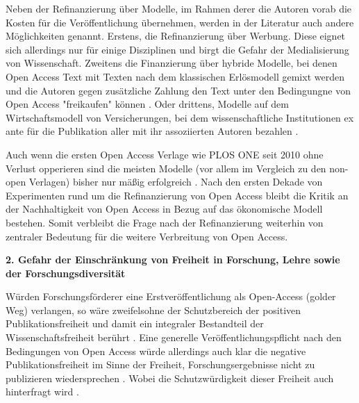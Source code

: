 Neben der Refinanzierung über Modelle, im Rahmen derer die Autoren vorab die Kosten für die Veröffentlichung übernehmen, werden in der Literatur auch andere Möglichkeiten genannt. Erstens, die Refinanzierung über Werbung. Diese eignet sich allerdings nur für einige Disziplinen \cite{bjork_2004_open} und birgt die Gefahr der Medialisierung von Wissenschaft. Zweitens die Finanzierung über hybride Modelle, bei denen Open Access Text mit Texten nach dem klassischen Erlösmodell gemixt werden und die Autoren gegen zusätzliche Zahlung den Text unter den Bedingungne von Open Access "freikaufen" können \cite{bjork_2012_hybrid}. Oder drittens, Modelle auf dem Wirtschaftsmodell von Versicherungen, bei dem wissenschaftliche Institutionen ex ante für die Publikation aller mit ihr assoziierten Autoren bezahlen \cite[:63]{mueller-langer_2010}.

Auch wenn die ersten Open Access Verlage wie PLOS ONE seit 2010 ohne Verlust opperieren \cite{Jerram_2010} sind die meisten Modelle (vor allem im Vergleich zu den non-open Verlagen) bisher nur mäßig erfolgreich \cite{bjork_2012_hybrid}. Nach den ersten Dekade von Experimenten rund um die Refinanzierung von Open Access bleibt die Kritik an der Nachhaltigkeit von Open Access in Bezug auf das ökonomische Modell bestehen. Somit verbleibt die Frage nach der Refinanzierung weiterhin von zentraler Bedeutung für die weitere Verbreitung von Open Access.

\textbf{2. Gefahr der Einschränkung von Freiheit in Forschung, Lehre sowie der Forschungsdiversität}

Würden Forschungsförderer eine Erstveröffentlichung als Open-Access (golder Weg) verlangen, so wäre zweifelsohne der Schutzbereich der positiven Publikationsfreiheit und damit ein integraler Bestandteil der Wissenschaftsfreiheit berührt \cite[:191]{Fehling_2014}. Eine generelle Veröffentlichungspflicht nach den Bedingungen von Open Access würde allerdings auch klar die negative Publikationsfreiheit im Sinne der Freiheit, Forschungsergebnisse nicht zu publizieren wiedersprechen \cite[:192]{Fehling_2014}. Wobei die Schutzwürdigkeit dieser Freiheit auch hinterfragt wird \cite[:192]{Fehling_2014}.

